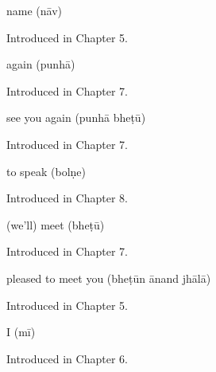 \noindent\begin{minipage}[t]{\linewidth}
\raggedright
\textbf{}\par
\small name (nāv)\par
\footnotesize Introduced in Chapter 5.
\end{minipage}\par\medskip

\noindent\begin{minipage}[t]{\linewidth}
\raggedright
\textbf{}\par
\small again (punhā)\par
\footnotesize Introduced in Chapter 7.
\end{minipage}\par\medskip

\noindent\begin{minipage}[t]{\linewidth}
\raggedright
\textbf{ }\par
\small see you again (punhā bheṭū)\par
\footnotesize Introduced in Chapter 7.
\end{minipage}\par\medskip

\noindent\begin{minipage}[t]{\linewidth}
\raggedright
\textbf{}\par
\small to speak (bolṇe)\par
\footnotesize Introduced in Chapter 8.
\end{minipage}\par\medskip

\noindent\begin{minipage}[t]{\linewidth}
\raggedright
\textbf{}\par
\small (we'll) meet (bheṭū)\par
\footnotesize Introduced in Chapter 7.
\end{minipage}\par\medskip

\noindent\begin{minipage}[t]{\linewidth}
\raggedright
\textbf{  }\par
\small pleased to meet you (bheṭūn ānand jhālā)\par
\footnotesize Introduced in Chapter 5.
\end{minipage}\par\medskip

\noindent\begin{minipage}[t]{\linewidth}
\raggedright
\textbf{}\par
\small I (mī)\par
\footnotesize Introduced in Chapter 6.
\end{minipage}\par\medskip

